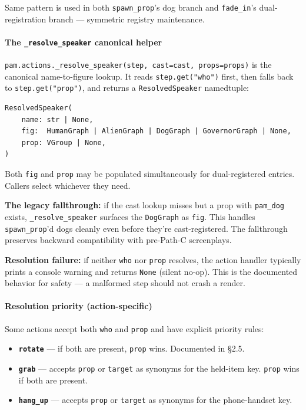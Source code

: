 \documentclass[
  12pt,
  letterpaper,
]{book}
\providecommand{\tightlist}{%
  \setlength{\itemsep}{0pt}\setlength{\parskip}{0pt}}
\begin{document}
Same pattern is used in both \texttt{spawn\_prop}'s dog branch and
\texttt{fade\_in}'s dual-registration branch --- symmetric registry
maintenance.

\paragraph{\texorpdfstring{The \texttt{\_resolve\_speaker} canonical
helper}{The \_resolve\_speaker canonical helper}}\label{the-_resolve_speaker-canonical-helper}

\texttt{pam.actions.\_resolve\_speaker(step,\ cast=cast,\ props=props)}
is the canonical name-to-figure lookup. It reads
\texttt{step.get("who")} first, then falls back to
\texttt{step.get("prop")}, and returns a \texttt{ResolvedSpeaker}
namedtuple:

\begin{verbatim}
ResolvedSpeaker(
    name: str | None,
    fig:  HumanGraph | AlienGraph | DogGraph | GovernorGraph | None,
    prop: VGroup | None,
)
\end{verbatim}

Both \texttt{fig} and \texttt{prop} may be populated simultaneously for
dual-registered entries. Callers select whichever they need.

\textbf{The legacy fallthrough:} if the cast lookup misses but a prop
with \texttt{pam\_dog} exists, \texttt{\_resolve\_speaker} surfaces the
\texttt{DogGraph} as \texttt{fig}. This handles \texttt{spawn\_prop}'d
dogs cleanly even before they're cast-registered. The fallthrough
preserves backward compatibility with pre-Path-C screenplays.

\textbf{Resolution failure:} if neither \texttt{who} nor \texttt{prop}
resolves, the action handler typically prints a console warning and
returns \texttt{None} (silent no-op). This is the documented behavior
for safety --- a malformed step should not crash a render.

\paragraph{Resolution priority
(action-specific)}\label{resolution-priority-action-specific}

Some actions accept both \texttt{who} and \texttt{prop} and have
explicit priority rules:

\begin{itemize}
\tightlist
\item
  \textbf{\texttt{rotate}} --- if both are present, \texttt{prop} wins.
  Documented in §2.5.
\item
  \textbf{\texttt{grab}} --- accepts \texttt{prop} or \texttt{target} as
  synonyms for the held-item key. \texttt{prop} wins if both are
  present.
\item
  \textbf{\texttt{hang\_up}} --- accepts \texttt{prop} or
  \texttt{target} as synonyms for the phone-handset key.
\end{itemize}
\end{document}
